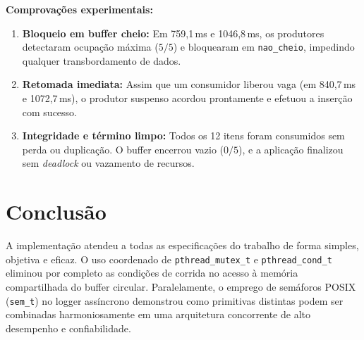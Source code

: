\documentclass[11pt, a4paper]{article}
\begin{document}
\noindent
\textbf{Comprovações experimentais:}
\begin{enumerate}\setlength{\itemsep}{0pt}\setlength{\parskip}{0pt}
    \item \textbf{Bloqueio em buffer cheio:} Em 759,1\,ms e 1046,8\,ms, os produtores detectaram ocupação máxima ($5/5$) e bloquearam em \texttt{nao\_cheio}, impedindo qualquer transbordamento de dados.
    \item \textbf{Retomada imediata:} Assim que um consumidor liberou vaga (em 840,7\,ms e 1072,7\,ms), o produtor suspenso acordou prontamente e efetuou a inserção com sucesso.
    \item \textbf{Integridade e término limpo:} Todos os 12 itens foram consumidos sem perda ou duplicação. O buffer encerrou vazio ($0/5$), e a aplicação finalizou sem \textit{deadlock} ou vazamento de recursos.
\end{enumerate}

\section{Conclusão}

A implementação atendeu a todas as especificações do trabalho de forma simples, objetiva e eficaz. O uso coordenado de \texttt{pthread\_mutex\_t} e \texttt{pthread\_cond\_t} eliminou por completo as condições de corrida no acesso à memória compartilhada do buffer circular. Paralelamente, o emprego de semáforos POSIX (\texttt{sem\_t}) no logger assíncrono demonstrou como primitivas distintas podem ser combinadas harmoniosamente em uma arquitetura concorrente de alto desempenho e confiabilidade.
\end{document}
